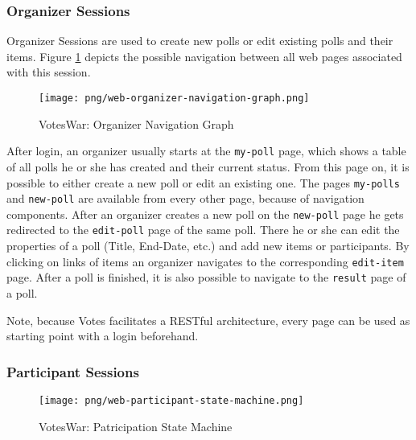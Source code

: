 \subsubsection{Organizer Sessions}
Organizer Sessions are used to create new polls or edit existing polls and their items.
Figure \ref{figure:web-organizer-navigation-graph} depicts the possible navigation between all web pages associated with this session. 

\begin{figure}[h]
\centering
\texttt{[image: png/web-organizer-navigation-graph.png]}
\caption{VotesWar: Organizer Navigation Graph}
\label{figure:web-organizer-navigation-graph}
\end{figure}

After login, an organizer usually starts at the \texttt{my-poll} page, which shows a table of all polls he or she has created and their current status.
From this page on, it is possible to either create a new poll or edit an existing one.
The pages \texttt{my-polls} and \texttt{new-poll} are available from every other page, because of navigation components.
After an organizer creates a new poll on the \texttt{new-poll} page he gets redirected to the \texttt{edit-poll} page of the same poll.
There he or she can edit the properties of a poll (Title, End-Date, etc.) and add new items or participants. 
By clicking on links of items an organizer navigates to the corresponding \texttt{edit-item} page.
After a poll is finished, it is also possible to navigate to the \texttt{result} page of a poll.

Note, because Votes facilitates a RESTful architecture, every page can be used as starting point with a login beforehand.

\subsubsection{Participant Sessions}
\begin{figure}[h]
\centering
\texttt{[image: png/web-participant-state-machine.png]}
\caption{VotesWar: Patricipation State Machine}
\label{figure:web-participation-state-machine}
\end{figure}




